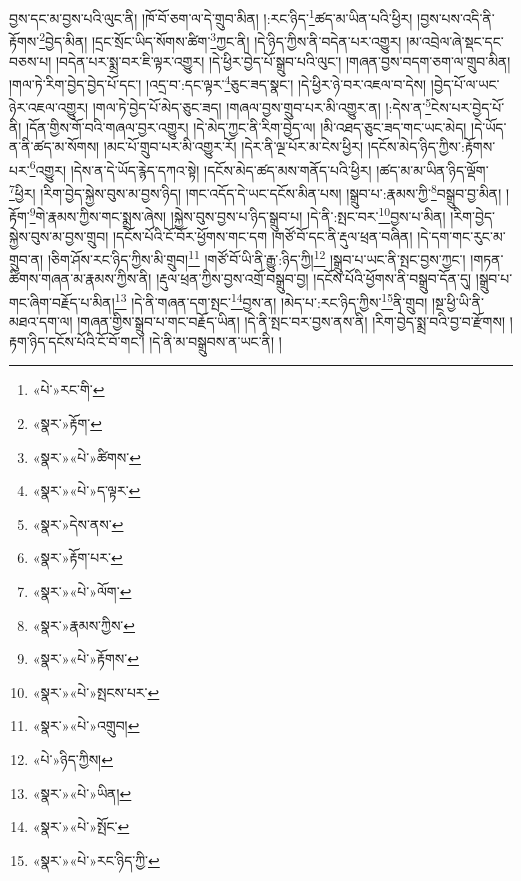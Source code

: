 བྱས་དང་མ་བྱས་པའི་ལུང་ནི། །ཁོ་བོ་ཅག་ལ་དེ་གྲུབ་མིན། །:རང་ཉིད་\footnote{«པེ་»རང་གི་}ཚད་མ་ཡིན་པའི་ཕྱིར། །བྱས་པས་འདི་ནི་རྟོགས་\footnote{«སྣར་»རྟོག་}བྱེད་མིན། །དྲང་སྲོང་ཡིད་སོགས་ཚིག་\footnote{«སྣར་»«པེ་»ཚིགས་}ཀྱང་ནི། །དེ་ཉིད་ཀྱིས་ནི་བདེན་པར་འགྱུར། །མ་འབྲེལ་ཞེ་སྡང་དང་བཅས་པ། །བདེན་པར་སྨྲ་བར་ཇི་ལྟར་འགྱུར། །དེ་ཕྱིར་བྱེད་པོ་སྒྲུབ་པའི་ལུང་། །གཞན་བྱས་བདག་ཅག་ལ་གྲུབ་མིན། །གལ་ཏེ་རིག་བྱེད་བྱེད་པོ་དང་། །འདྲ་བ་:དང་ལྟར་\footnote{«སྣར་»«པེ་»ད་ལྟར་}ཅུང་ཟད་སྣང་། །དེ་ཕྱིར་ཉེ་བར་འཇལ་བ་དེས། །བྱེད་པོ་ལ་ཡང་ཉེར་འཇལ་འགྱུར། །གལ་ཏེ་བྱེད་པོ་མེད་ཅུང་ཟད། །གཞལ་བྱས་གྲུབ་པར་མི་འགྱུར་ན། །:དེས་ན་\footnote{«སྣར་»དེས་ནས་}ངེས་པར་བྱེད་པོ་ནི། །དོན་གྱིས་གོ་བའི་གཞལ་བྱར་འགྱུར། །དེ་མེད་ཀྱང་ནི་རིག་བྱེད་ལ། །མི་འཐད་ཅུང་ཟད་གང་ཡང་མེད། །དེ་ཡོད་ན་ནི་ཚད་མ་སོགས། །མང་པོ་གྲུབ་པར་མི་འགྱུར་རོ། །དེར་ནི་ལྔ་པོར་མ་ངེས་ཕྱིར། །དངོས་མེད་ཉིད་ཀྱིས་:རྟོགས་པར་\footnote{«སྣར་»རྟོག་པར་}འགྱུར། །དེས་ན་དེ་ཡོད་རྙེད་དཀའ་སྟེ། །དངོས་མེད་ཚད་མས་གནོད་པའི་ཕྱིར། །ཚད་མ་མ་ཡིན་ཉིད་ལྡོག་\footnote{«སྣར་»«པེ་»ལོག་}ཕྱིར། །རིག་བྱེད་སྐྱེས་བུས་མ་བྱས་ཉིད། །གང་འདོད་དེ་ཡང་དངོས་མིན་པས། །སྒྲུབ་པ་:རྣམས་ཀྱི་\footnote{«སྣར་»རྣམས་ཀྱིས་}བསྒྲུབ་བྱ་མིན། །རྟོག་\footnote{«སྣར་»«པེ་»རྟོགས་}གེ་རྣམས་ཀྱིས་གང་སྨྲས་ཞེས། །སྐྱེས་བུས་བྱས་པ་ཉིད་སྒྲུབ་པ། །དེ་ནི་:སྤང་བར་\footnote{«སྣར་»«པེ་»སྤངས་པར་}བྱས་པ་མིན། །རིག་བྱེད་སྐྱེས་བུས་མ་བྱས་གྲུབ། །དངོས་པོའི་ངོ་བོར་ཕྱོགས་གང་དག །གཙོ་བོ་དང་ནི་རྡུལ་ཕྲན་བཞིན། །དེ་དག་གང་རུང་མ་གྲུབ་ན། །ཅིག་ཤོས་རང་ཉིད་ཀྱིས་མི་གྲུབ།\footnote{«སྣར་»«པེ་»འགྲུབ།} །གཙོ་བོ་ཡི་ནི་རྒྱུ་:ཉིད་ཀྱི།\footnote{«པེ་»ཉིད་ཀྱིས།} །སྒྲུབ་པ་ཡང་ནི་སྤང་བྱས་ཀྱང་། །གཏན་ཚིགས་གཞན་མ་རྣམས་ཀྱིས་ནི། །རྡུལ་ཕྲན་ཀྱིས་བྱས་འགྲོ་བསྒྲུབ་བྱ། །དངོས་པོའི་ཕྱོགས་ནི་བསྒྲུབ་དོན་དུ། །སྒྲུབ་པ་གང་ཞིག་བརྗོད་པ་མིན།\footnote{«སྣར་»«པེ་»ཡིན།} །དེ་ནི་གཞན་དག་སྤང་\footnote{«སྣར་»«པེ་»སྤོང་}བྱས་ན། །མེད་པ་:རང་ཉིད་ཀྱིས་\footnote{«སྣར་»«པེ་»རང་ཉིད་ཀྱི་}ནི་གྲུབ། །སྔ་ཕྱི་ཡི་ནི་མཐའ་དག་ལ། །གཞན་གྱིས་སྒྲུབ་པ་གང་བརྗོད་ཡིན། །དེ་ནི་སྤང་བར་བྱས་ནས་ནི། །རིག་བྱེད་སྨྲ་བའི་བྱ་བ་རྫོགས། །རྟག་ཉིད་དངོས་པོའི་ངོ་བོ་གང་། །དེ་ནི་མ་བསྒྲུབས་ན་ཡང་ནི། །
